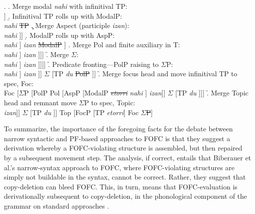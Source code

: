 \documentclass[output=paper]{langscibook}
\begin{document}
\exi.
\a. Merge modal \textit{nahi} with infinitival TP:\\
[ModalP \textit{nahi} [TP \textit{etorri} ]]  
\b. Infinitival TP rolls up with ModalP:\\
 [ModalP [TP \textit{etorri}] \textit{nahi} \st{TP}
\c. Merge Aspect (participle \textit{izan}):\\
 [AspP \textit{izan} [ModalP [TP \textit{etorri} ] \textit{nahi}  ]] 
 \d. ModalP rolls up with AspP:\\
 [AspP [ModalP [TP \textit{etorri} ] \textit{nahi} ]  \textit{izan} \st{ModalP}  ]
 \e. Merge Pol and finite auxiliary in T:\\
 [TP \textit{du} [PolP Pol [AspP [ModalP [TP \textit{etorri} ] \textit{nahi} ]  \textit{izan}   ]]]
\f. Merge $\Sigma$:\\
 [$\Sigma$P $\Sigma$ [TP \textit{du} [PolP Pol [AspP [ModalP [TP \textit{etorri} ] \textit{nahi} ]  \textit{izan} ]]]]
\f. Predicate fronting---PolP raising to $\Sigma$P:\\
 [$\Sigma$P  [PolP Pol [AspP [ModalP [TP \textit{etorri} ] \textit{nahi} ]  \textit{izan}   ]] $\Sigma$ [TP \textit{du} \st{PolP} ]]
\f. Merge focus head and move infinitival TP to spec, Foc:\\
 [FocP [TP \textit{etorri}] Foc [$\Sigma$P [PolP Pol [AspP [ModalP \st{\textit{etorri}} \textit{nahi} ]  \textit{izan}]] $\Sigma$ [TP \textit{du} ]]]
 \f. Merge Topic head and remnant move $\Sigma$P to spec, Topic:\\
 [TopP   [$\Sigma$P [PolP Pol [AspP [ModalP  \textit{nahi} ]  \textit{izan}]] $\Sigma$ [TP \textit{du} ]] Top [FocP [TP \textit{etorri}] Foc \st{$\Sigma$P}]

 
To summarize, the importance of the foregoing facts for the debate between narrow syntactic and PF-based approaches to FOFC is that they suggest a derivation whereby a FOFC-violating structure is assembled, but then repaired by a subsequent movement step. The analysis, if correct, entails that Biberauer et al.'s narrow-syntax approach to FOFC, where FOFC-violating structures are simply not buildable in the syntax, cannot be correct. Rather, they suggest that copy-deletion can bleed FOFC. This, in turn, means that FOFC-evaluation is derivationally subsequent to copy-deletion, in the phonological component of the grammar on standard approaches \citep{nunes2004}.
	
	
\end{document}
